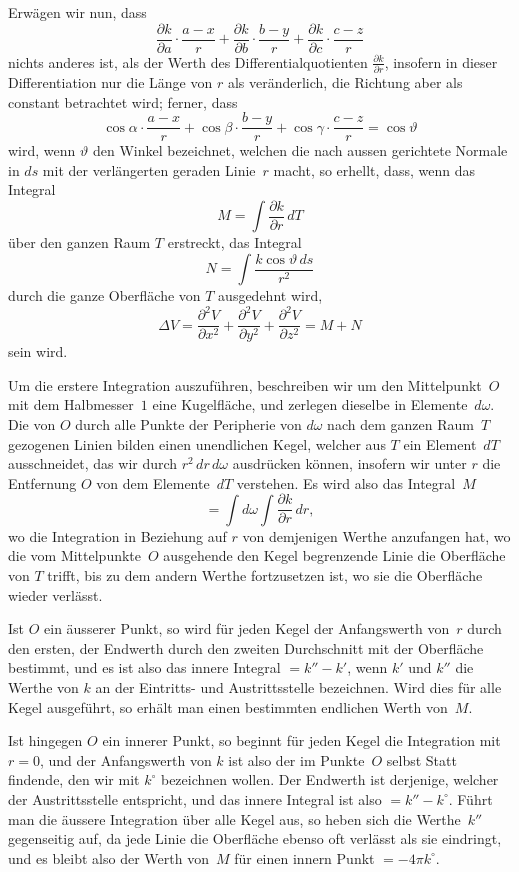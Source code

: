 \documentclass[12pt,a4paper]{article}
\begin{document}
Erwägen wir nun, dass
\[
\frac{\partial k}{\partial a}\cdot\frac{a-x}{r}
+\frac{\partial k}{\partial b}\cdot\frac{b-y}{r}
+\frac{\partial k}{\partial c}\cdot\frac{c-z}{r}
\]
nichts anderes ist, als der Werth des Differentialquotienten $\frac{\partial k}{\partial r}$, insofern in dieser
Differentiation nur die Länge von $r$ als veränderlich, die Richtung aber als
constant betrachtet wird; ferner, dass
\[
\cos\alpha\cdot\frac{a-x}{r}+\cos\beta\cdot\frac{b-y}{r}+\cos\gamma\cdot\frac{c-z}{r}=\cos\vartheta
\]
wird, wenn $\vartheta$ den Winkel bezeichnet, welchen die nach aussen gerichtete Normale
in $ds$ mit der verlängerten geraden Linie~$r$ macht, so erhellt, dass, wenn das Integral
\[
M = \int\frac{\partial k}{\partial r}\,dT
\]
über den ganzen Raum $T$ erstreckt, das Integral
\[
N = \int\frac{k\cos\vartheta\,ds}{r^2}
\]
durch die ganze Oberfläche von $T$ ausgedehnt wird,
\[
\Delta V = \frac{\partial^2 V}{\partial x^2}+\frac{\partial^2 V}{\partial y^2}+\frac{\partial^2 V}{\partial z^2} = M+N
\]
sein wird.

Um die erstere Integration auszuführen, beschreiben wir um den Mittelpunkt~$O$
mit dem Halbmesser~$1$ eine Kugelfläche, und zerlegen dieselbe in Elemente~$d\omega$.
Die von $O$ durch alle Punkte der Peripherie von $d\omega$ nach dem ganzen Raum~$T$
gezogenen Linien bilden einen unendlichen Kegel, welcher aus $T$ ein Element~$dT$
ausschneidet, das wir durch $r^2\,dr\,d\omega$ ausdrücken können, insofern wir unter $r$
die Entfernung $O$ von dem Elemente~$dT$ verstehen. Es wird also das Integral~$M$
\[
=\int d\omega\int\frac{\partial k}{\partial r}\,dr,
\]
wo die Integration in Beziehung auf $r$ von demjenigen Werthe anzufangen hat,
wo die vom Mittelpunkte~$O$ ausgehende den Kegel begrenzende Linie die Oberfläche
von $T$ trifft, bis zu dem andern Werthe fortzusetzen ist, wo sie die Oberfläche
wieder verlässt.

Ist $O$ ein äusserer Punkt, so wird für jeden Kegel der Anfangswerth von~$r$
durch den ersten, der Endwerth durch den zweiten Durchschnitt mit der Oberfläche
bestimmt, und es ist also das innere Integral $=k''-k'$, wenn $k'$ und $k''$ die Werthe
von $k$ an der Eintritts- und Austrittsstelle bezeichnen. Wird dies für alle Kegel
ausgeführt, so erhält man einen bestimmten endlichen Werth von~$M$.

Ist hingegen $O$ ein innerer Punkt, so beginnt für jeden Kegel die Integration
mit $r=0$, und der Anfangswerth von $k$ ist also der im Punkte~$O$ selbst Statt
findende, den wir mit $k^{\circ}$ bezeichnen wollen. Der Endwerth ist derjenige, welcher
der Austrittsstelle entspricht, und das innere Integral ist also $=k''-k^{\circ}$. Führt
man die äussere Integration über alle Kegel aus, so heben sich die Werthe~$k''$
gegenseitig auf, da jede Linie die Oberfläche ebenso oft verlässt als sie eindringt,
und es bleibt also der Werth von~$M$ für einen innern Punkt $=-4\pi k^{\circ}$.
\end{document}
